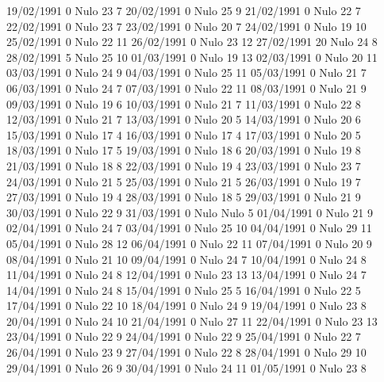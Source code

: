 19/02/1991  0     Nulo    23     7 
20/02/1991  0     Nulo    25     9 
21/02/1991  0     Nulo    22     7 
22/02/1991  0     Nulo    23     7 
23/02/1991  0     Nulo    20     7 
24/02/1991  0     Nulo    19     10 
25/02/1991  0     Nulo    22     11 
26/02/1991  0     Nulo    23     12 
27/02/1991  20    Nulo    24     8 
28/02/1991  5     Nulo    25     10 
01/03/1991  0     Nulo    19     13 
02/03/1991  0     Nulo    20     11 
03/03/1991  0     Nulo    24     9 
04/03/1991  0     Nulo    25     11 
05/03/1991  0     Nulo    21     7 
06/03/1991  0     Nulo    24     7 
07/03/1991  0     Nulo    22     11 
08/03/1991  0     Nulo    21     9 
09/03/1991  0     Nulo    19     6 
10/03/1991  0     Nulo    21     7 
11/03/1991  0     Nulo    22     8 
12/03/1991  0     Nulo    21     7 
13/03/1991  0     Nulo    20     5 
14/03/1991  0     Nulo    20     6 
15/03/1991  0     Nulo    17     4 
16/03/1991  0     Nulo    17     4 
17/03/1991  0     Nulo    20     5 
18/03/1991  0     Nulo    17     5 
19/03/1991  0     Nulo    18     6 
20/03/1991  0     Nulo    19     8 
21/03/1991  0     Nulo    18     8 
22/03/1991  0     Nulo    19     4 
23/03/1991  0     Nulo    23     7 
24/03/1991  0     Nulo    21     5 
25/03/1991  0     Nulo    21     5 
26/03/1991  0     Nulo    19     7 
27/03/1991  0     Nulo    19     4 
28/03/1991  0     Nulo    18     5 
29/03/1991  0     Nulo    21     9 
30/03/1991  0     Nulo    22     9 
31/03/1991  0     Nulo   Nulo    5 
01/04/1991  0     Nulo    21     9 
02/04/1991  0     Nulo    24     7 
03/04/1991  0     Nulo    25     10 
04/04/1991  0     Nulo    29     11 
05/04/1991  0     Nulo    28     12 
06/04/1991  0     Nulo    22     11 
07/04/1991  0     Nulo    20     9 
08/04/1991  0     Nulo    21     10 
09/04/1991  0     Nulo    24     7 
10/04/1991  0     Nulo    24     8 
11/04/1991  0     Nulo    24     8 
12/04/1991  0     Nulo    23     13 
13/04/1991  0     Nulo    24     7 
14/04/1991  0     Nulo    24     8 
15/04/1991  0     Nulo    25     5 
16/04/1991  0     Nulo    22     5 
17/04/1991  0     Nulo    22     10 
18/04/1991  0     Nulo    24     9 
19/04/1991  0     Nulo    23     8 
20/04/1991  0     Nulo    24     10 
21/04/1991  0     Nulo    27     11 
22/04/1991  0     Nulo    23     13 
23/04/1991  0     Nulo    22     9 
24/04/1991  0     Nulo    22     9 
25/04/1991  0     Nulo    22     7 
26/04/1991  0     Nulo    23     9 
27/04/1991  0     Nulo    22     8 
28/04/1991  0     Nulo    29     10 
29/04/1991  0     Nulo    26     9 
30/04/1991  0     Nulo    24     11 
01/05/1991  0     Nulo    23     8 
